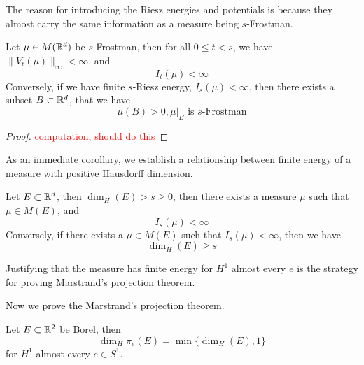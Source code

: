 The reason for introducing the Riesz energies and potentials is because they almost carry the same information as a measure being $s$-Frostman.
\begin{proposition}
    Let $\mu\in M(\mathbb{R}^d)$ be $s$-Frostman, then for all $0\leq t<s$, we have $\|V_t(\mu)\|_\infty<\infty$, and
    \begin{equation*}
        I_t(\mu)<\infty
    \end{equation*}
    Conversely, if we have finite $s$-Riesz energy, $I_s(\mu)<\infty$, then there exists a subset $B\subset\mathbb{R}^d$, that we have
    \begin{equation*}
        \mu(B)>0, \mu\vert_B \text{ is $s$-Frostman}
    \end{equation*}
\end{proposition}
\begin{proof}
    \textcolor{red}{computation, should do this}
\end{proof}

As an immediate corollary, we establish a relationship between finite energy of a measure with positive Hausdorff dimension.
\begin{corollary}
    Let $E\subset\mathbb{R}^d$, then $\dim_H(E)>s\geq0$, then there exists a measure $\mu$ such that $\mu\in M(E)$, and 
    \begin{equation*}
        I_s(\mu)<\infty
    \end{equation*}
    Conversely, if there exists a $\mu\in M(E)$ such that $I_s(\mu)<\infty$, then we have
    \begin{equation*}
        \dim_H(E)\geq s
    \end{equation*}
\end{corollary}

\begin{note}
    Justifying that the measure has finite energy for $H^1$ almost every $e$ is the strategy for proving Marstrand's projection theorem.
\end{note}
Now we prove the Marstrand's projection theorem.
\begin{theorem}
    Let $E\subset\mathbb{R}^2$ be Borel, then
    \begin{equation*}
        \dim_H\pi_e(E)=\min\{\dim_H(E), 1\}
    \end{equation*}
    for $H^1$ almost every $e\in S^1$.
\end{theorem}


